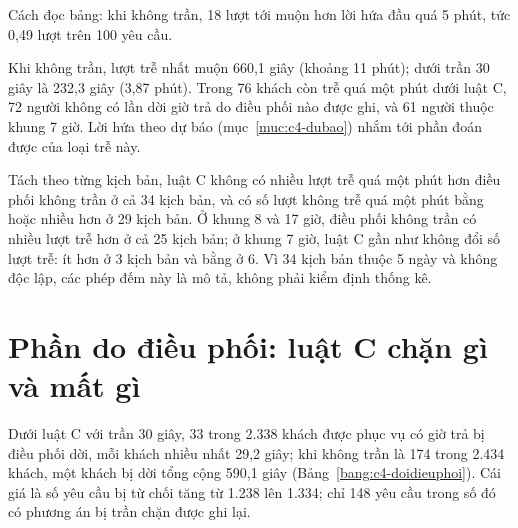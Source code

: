 Cách đọc bảng: khi không trần, 18 lượt tới muộn hơn lời hứa đầu quá 5 phút, tức 0,49 lượt trên 100 yêu cầu.

Khi không trần, lượt trễ nhất muộn 660,1 giây (khoảng 11 phút); dưới trần 30 giây là 232,3 giây (3,87 phút). Trong 76
khách còn trễ quá một phút dưới luật C, 72 người không có lần dời giờ trả do điều phối nào được ghi, và 61 người thuộc
khung 7 giờ. Lời hứa theo dự báo (mục~\ref{muc:c4-dubao}) nhắm tới phần đoán được của loại trễ này.

Tách theo từng kịch bản, luật C không có nhiều lượt trễ quá một phút hơn điều phối không trần ở cả 34 kịch bản, và
có số lượt không trễ quá một phút bằng hoặc nhiều hơn ở 29 kịch bản. Ở khung 8 và 17 giờ, điều phối không trần có
nhiều lượt trễ hơn ở cả 25 kịch bản; ở khung 7 giờ, luật C gần như không đổi số lượt trễ: ít hơn ở 3 kịch bản và bằng
ở 6. Vì 34 kịch bản thuộc 5 ngày và không độc lập, các phép đếm này là mô tả, không phải kiểm định thống kê.

\section{Phần do điều phối: luật C chặn gì và mất gì}
\label{muc:c4-dieuphoi}

Dưới luật C với trần 30 giây, 33 trong 2.338 khách được phục vụ có giờ trả bị điều phối dời, mỗi khách nhiều nhất
29,2 giây; khi không trần là 174 trong 2.434 khách, một khách bị dời tổng cộng 590,1 giây
(Bảng~\ref{bang:c4-doidieuphoi}). Cái giá là số yêu cầu bị từ chối tăng từ 1.238 lên 1.334; chỉ 148 yêu cầu trong số
đó có phương án bị trần chặn được ghi lại.

